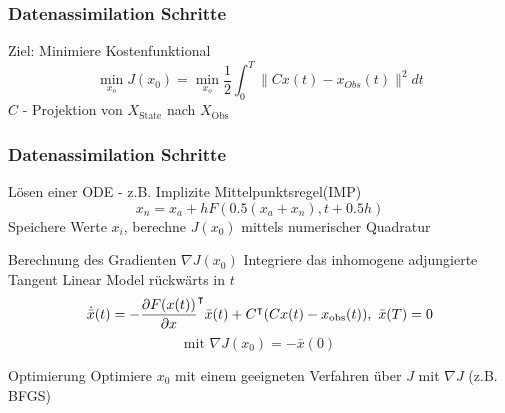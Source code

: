 \begin{frame}[<+->]
  \frametitle{Datenassimilation Schritte}
	\begin{block}{Ziel: Minimiere Kostenfunktional}
	\begin{equation}\label{eq:costFunctional}
		\min_{x_o} J(x_0) = \min_{x_o} \frac{1}{2}\int_0^T \|Cx(t) - x_{Obs}(t)\|^2dt
	\end{equation}
	  $C$ - Projektion von $X_{\text{State}}$ nach $X_{\text{Obs}}$ 
	\end{block}
\end{frame}
 
\begin{frame}[<+->]
  \frametitle{Datenassimilation Schritte}
  \begin{block}{Lösen einer ODE - z.B. Implizite Mittelpunktsregel(IMP)}
	\begin{equation}
	 x_n = x_a + h F \left(0.5 (x_a + x_n), t + 0.5 h\right)
	\end{equation}
	Speichere Werte $x_i$, berechne $J(x_0)$ mittels numerischer Quadratur
  \end{block}
  \begin{block}{Berechnung des Gradienten $\nabla J(x_0)$}
	Integriere das inhomogene adjungierte Tangent Linear Model rückwärts in $t$
	\begin{equation}
	  \dot{ \bar{x}}(t) =  -\frac{\partial F(x(t))}{\partial x}^\intercal \bar x(t) +C^\intercal(Cx(t) - x_{\text{obs}}(t)), ~ \bar x(T) =0
	\end{equation}
	\[
	\text{mit }\nabla J(x_0) = -\bar x(0)
	\]
  \end{block}
  \begin{block}{Optimierung}
	Optimiere $x_0$ mit einem geeigneten Verfahren über $J$ mit $\nabla J$ (z.B. BFGS)
  \end{block}

\end{frame} 

